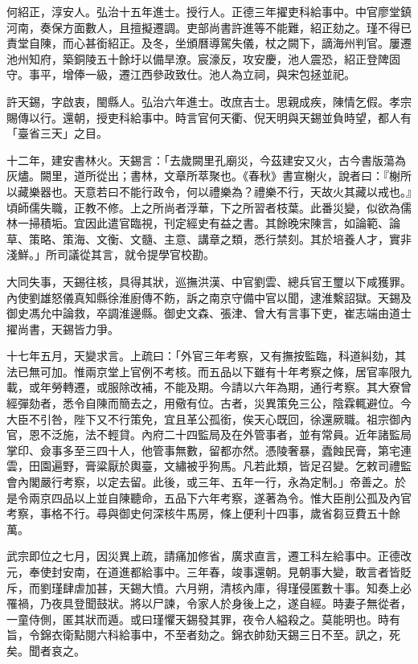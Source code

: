 \begin{pinyinscope}
何紹正，淳安人。弘治十五年進士。授行人。正德三年擢吏科給事中。中官廖堂鎮河南，奏保方面數人，且擅擬遷調。吏部尚書許進等不能難，紹正劾之。瑾不得已責堂自陳，而心甚銜紹正。及冬，坐頒曆導駕失儀，杖之闕下，謫海州判官。屢遷池州知府，築銅陵五十餘圩以備旱潦。宸濠反，攻安慶，池人震恐，紹正登陴固守。事平，增俸一級，遷江西參政致仕。池人為立祠，與宋包拯並祀。

許天錫，字啟衷，閩縣人。弘治六年進士。改庶吉士。思親成疾，陳情乞假。孝宗賜傳以行。還朝，授吏科給事中。時言官何天衢、倪天明與天錫並負時望，都人有「臺省三天」之目。

十二年，建安書林火。天錫言：「去歲闕里孔廟災，今茲建安又火，古今書版蕩為灰燼。闕里，道所從出；書林，文章所萃聚也。《春秋》書宣榭火，說者曰：『榭所以藏樂器也。天意若曰不能行政令，何以禮樂為？禮樂不行，天故火其藏以戒也。』頃師儒失職，正教不修。上之所尚者浮華，下之所習者枝葉。此番災變，似欲為儒林一掃積垢。宜因此遣官臨視，刊定經史有益之書。其餘晚宋陳言，如論範、論草、策略、策海、文衡、文髓、主意、講章之類，悉行禁刻。其於培養人才，實非淺鮮。」所司議從其言，就令提學官校勘。

大同失事，天錫往核，具得其狀，巡撫洪漢、中官劉雲、總兵官王璽以下咸獲罪。內使劉雄怒儀真知縣徐淮廚傳不飭，訴之南京守備中官以聞，逮淮繫詔獄。天錫及御史馮允中論救，卒調淮邊縣。御史文森、張津、曾大有言事下吏，崔志端由道士擢尚書，天錫皆力爭。

十七年五月，天變求言。上疏曰：「外官三年考察，又有撫按監臨，科道糾劾，其法已無可加。惟兩京堂上官例不考核。而五品以下雖有十年考察之條，居官率限九載，或年勞轉遷，或服除改補，不能及期。今請以六年為期，通行考察。其大寮曾經彈劾者，悉令自陳而簡去之，用儆有位。古者，災異策免三公，陰霖輒避位。今大臣不引咎，陛下又不行策免，宜且革公孤銜，俟天心既回，徐還厥職。祖宗御內官，恩不泛施，法不輕貸。內府二十四監局及在外管事者，並有常員。近年諸監局掌印、僉事多至三四十人，他管事無數，留都亦然。憑陵奢暴，蠹蝕民膏，第宅連雲，田園遍野，膏粱厭於輿臺，文繡被乎狗馬。凡若此類，皆足召變。乞敕司禮監會內閣嚴行考察，以定去留。此後，或三年、五年一行，永為定制。」帝善之。於是令兩京四品以上並自陳聽命，五品下六年考察，遂著為令。惟大臣削公孤及內官考察，事格不行。尋與御史何深核牛馬房，條上便利十四事，歲省芻豆費五十餘萬。

武宗即位之七月，因災異上疏，請痛加修省，廣求直言，遷工科左給事中。正德改元，奉使封安南，在道進都給事中。三年春，竣事還朝。見朝事大變，敢言者皆貶斥，而劉瑾肆虐加甚，天錫大憤。六月朔，清核內庫，得瑾侵匿數十事。知奏上必罹禍，乃夜具登聞鼓狀。將以尸諫，令家人於身後上之，遂自經。時妻子無從者，一童侍側，匿其狀而遁。或曰瑾懼天錫發其罪，夜令人縊殺之。莫能明也。時有旨，令錦衣衛點閱六科給事中，不至者劾之。錦衣帥劾天錫三日不至。訊之，死矣。聞者哀之。


\end{pinyinscope}
